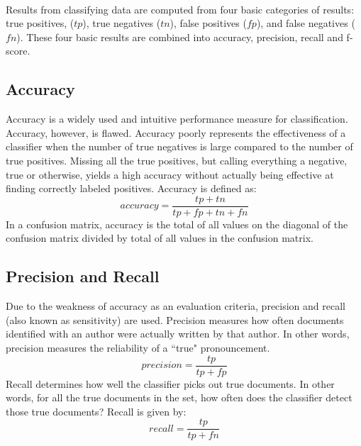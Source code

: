 	\paragraph{}Results from classifying data are computed from four basic categories of results: true positives, ($tp$), true negatives ($tn$), false positives ($fp$), and false negatives ($fn$).  These four basic results are combined into accuracy, precision, recall and f-score.
	
	\subsection {Accuracy} Accuracy is a widely used and intuitive performance measure for classification.  Accuracy, however, is flawed.  Accuracy poorly represents the effectiveness of a classifier when the number of true negatives is large compared to the number of true positives.  Missing all the true positives, but calling everything a negative, true or otherwise, yields a high accuracy without actually being effective at finding correctly labeled positives.  Accuracy is defined as:
	\begin{equation} accuracy = \frac{tp + tn}{tp + fp + tn + fn} \end{equation}\cite{sokolova_beyond_2006}
	In a confusion matrix, accuracy is the total of all values on the diagonal of the confusion matrix divided by total of all values in the confusion matrix.

	\subsection {Precision and Recall} Due to the weakness of accuracy as an evaluation criteria, precision and recall (also known as sensitivity) are used.  Precision measures how often documents identified with an author were actually written by that author.  In other words, precision measures the reliability of a ``true" pronouncement.
	\begin{equation} precision = \frac{tp}{tp + fp} \end{equation} Recall determines how well the classifier picks out true documents.  In other words, for all the true documents in the set, how often does the classifier detect those true documents?  Recall is given by:
	\begin{equation} recall = \frac{tp}{tp + fn} \end{equation}\cite{sokolova_beyond_2006}

